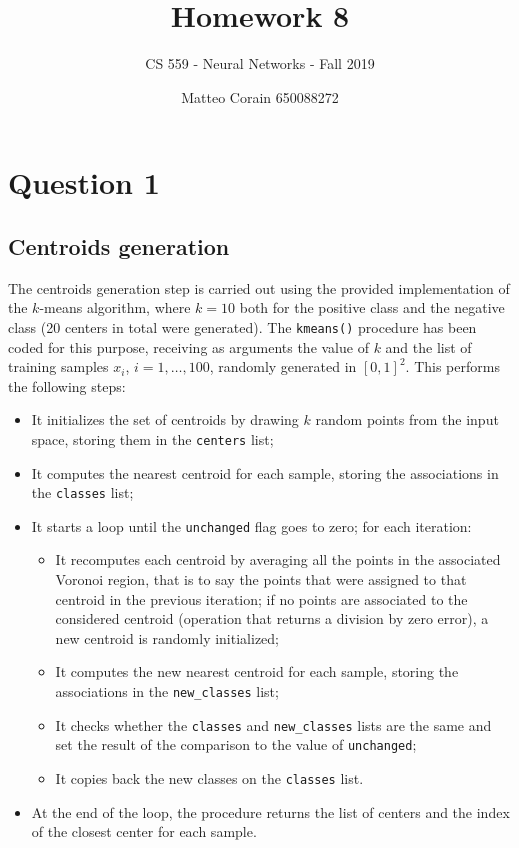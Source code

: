 \documentclass[letterpaper,headings=standardclasses]{scrartcl}
\title{Homework 8}
\subtitle{CS 559 - Neural Networks - Fall 2019}
\author{Matteo Corain 650088272}
\begin{document}
\maketitle

\section{Question 1}

\subsection{Centroids generation}

The centroids generation step is carried out using the provided implementation of the $k$-means algorithm, where $k = 10$ both for the positive class and the negative class (20 centers in total were generated). The \texttt{kmeans()} procedure has been coded for this purpose, receiving as arguments the value of $k$ and the list of training samples $x_i$, $i = 1, \dots, 100$, randomly generated in $\left[ 0,1 \right]^2$. This performs the following steps:

\begin{itemize}
    \item It initializes the set of centroids by drawing $k$ random points from the input space, storing them in the \texttt{centers} list;
    \item It computes the nearest centroid for each sample, storing the associations in the \texttt{classes} list;
    \item It starts a loop until the \texttt{unchanged} flag goes to zero; for each iteration:
    \begin{itemize}
        \item It recomputes each centroid by averaging all the points in the associated Voronoi region, that is to say the points that were assigned to that centroid in the previous iteration; if no points are associated to the considered centroid (operation that returns a division by zero error), a new centroid is randomly initialized;
        \item It computes the new nearest centroid for each sample, storing the associations in the \texttt{new\_classes} list;
        \item It checks whether the \texttt{classes} and \texttt{new\_classes} lists are the same and set the result of the comparison to the value of \texttt{unchanged};
        \item It copies back the new classes on the \texttt{classes} list.
    \end{itemize}
    \item At the end of the loop, the procedure returns the list of centers and the index of the closest center for each sample.
\end{itemize}
\end{document}
